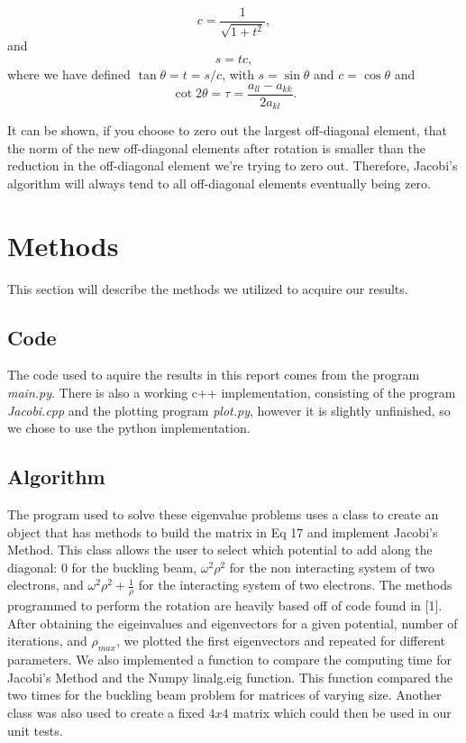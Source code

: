 \documentclass{emulateapj}
\begin{document}
\begin{equation}
   c = \frac{1}{\sqrt{1+t^2}},
\end{equation}
and
\begin{equation}
    s = tc,
\end{equation}
where we have defined $\tan\theta = t= s/c$, with $s=\sin\theta$ and $c=\cos\theta$ and
\begin{equation*}
    \cot 2\theta=\tau = \frac{a_{ll}-a_{kk}}{2a_{kl}}.
\end{equation*}

It can be shown, if you choose to zero out the largest off-diagonal element, that the norm of the new off-diagonal elements after rotation is smaller than the reduction in the off-diagonal element we're trying to zero out. Therefore, Jacobi's algorithm will always tend to all off-diagonal elements eventually being zero.

\section{Methods}
\label{sec:methods}
This section will describe the methods we utilized to acquire our results.

\subsection{Code}
The code used to aquire the results in this report comes from the program \textit{main.py}. There is also a working c++ implementation, consisting of the program \textit{Jacobi.cpp} and the plotting program \textit{plot.py}, however it is slightly unfinished, so we chose to use the python implementation.

\subsection{Algorithm}
The program used to solve these eigenvalue problems uses a class to create an object that has methods to build the matrix in Eq 17 and implement Jacobi's Method. This class allows the user to select which potential to add along the diagonal: 0 for the buckling beam, $\omega^2 \rho^2$ for the non interacting system of two electrons, and $\omega^2 \rho^2 + \frac{1}{\rho}$ for the interacting system of two electrons. The methods programmed to perform the rotation are heavily based off of code found in [1]. After obtaining the eigeinvalues and eigenvectors for a given potential, number of iterations, and $\rho_{max}$, we plotted the first eigenvectors and repeated for different parameters. We also implemented a function to compare the computing time for Jacobi's Method and the Numpy linalg.eig function. This function compared the two times for the buckling beam problem for matrices of varying size. Another class was also used to create a fixed $4x4$ matrix which could then be used in our unit tests.
\end{document}
